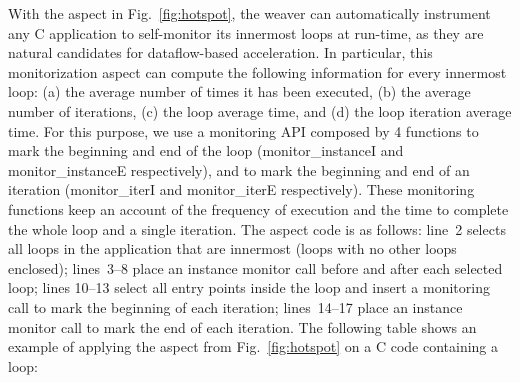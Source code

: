 \noindent With the aspect in Fig.~\ref{fig:hotspot}, the weaver can
automatically instrument any C application to self-monitor its
innermost loops at run-time, as they are natural candidates for
dataflow-based acceleration. In particular, this monitorization aspect
can compute the following information for every innermost loop: (a)
the average number of times it has been executed, (b) the average
number of iterations, (c) the loop average time, and (d) the loop
iteration average time. For this purpose, we use a monitoring API
composed by 4 functions to mark the beginning and end of the loop
(monitor\_instanceI and monitor\_instanceE respectively), and to mark
the beginning and end of an iteration (monitor\_iterI and
monitor\_iterE respectively). These monitoring functions keep an
account of the frequency of execution and the time to complete the
whole loop and a single iteration.  The aspect code is as follows:
line~2 selects all loops in the application that are innermost (loops
with no other loops enclosed); lines~3--8 place an instance monitor
call before and after each selected loop; lines 10--13 select all entry
points inside the loop and insert a monitoring call to mark the
beginning of each iteration; lines~14--17 place an instance monitor
call to mark the end of each iteration. The following table shows an
example of applying the aspect from Fig.~\ref{fig:hotspot} on a C code
containing a loop:
\vspace{2mm}

